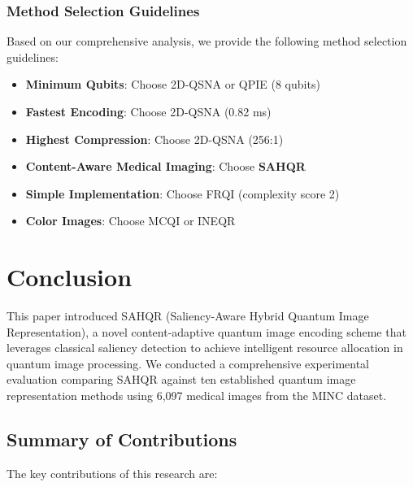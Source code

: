\documentclass[pdflatex,sn-mathphys-num,Numbered]{sn-jnl}
\theoremstyle{thmstyleone}
\theoremstyle{thmstyletwo}
\theoremstyle{thmstylethree}
\begin{document}
\subsubsection{Method Selection Guidelines}

Based on our comprehensive analysis, we provide the following method selection guidelines:

\begin{itemize}
\item \textbf{Minimum Qubits}: Choose 2D-QSNA or QPIE (8 qubits)
\item \textbf{Fastest Encoding}: Choose 2D-QSNA (0.82 ms)
\item \textbf{Highest Compression}: Choose 2D-QSNA (256:1)
\item \textbf{Content-Aware Medical Imaging}: Choose \textbf{SAHQR}
\item \textbf{Simple Implementation}: Choose FRQI (complexity score 2)
\item \textbf{Color Images}: Choose MCQI or INEQR
\end{itemize}

\section{Conclusion}\label{sec:conclusion}

This paper introduced SAHQR (Saliency-Aware Hybrid Quantum Image Representation), a novel content-adaptive quantum image encoding scheme that leverages classical saliency detection to achieve intelligent resource allocation in quantum image processing. We conducted a comprehensive experimental evaluation comparing SAHQR against ten established quantum image representation methods using 6,097 medical images from the MINC dataset.

\subsection{Summary of Contributions}

The key contributions of this research are:
\end{document}

